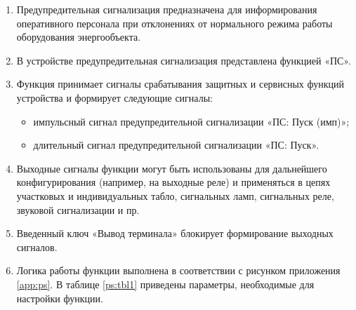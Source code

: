 
\color{black}

\begin{enumerate}

\item	
Предупредительная сигнализация предназначена для информирования оперативного персонала при отклонениях от нормального режима работы оборудования энергообъекта.

\item
В устройстве предупредительная сигнализация представлена функцией «ПС».

\item
Функция принимает сигналы срабатывания защитных и сервисных функций устройства и формирует следующие сигналы:
\begin{itemize}
	\item импульсный сигнал предупредительной сигнализации «ПС: Пуск (имп)»;
	\item длительный сигнал предупредительной сигнализации «ПС: Пуск».
\end{itemize}

\item
Выходные сигналы функции могут быть использованы для дальнейшего конфигурирования (например, на выходные реле) и применяться в цепях участковых и индивидуальных табло, сигнальных ламп, сигнальных реле, звуковой сигнализации и пр.

\item
Введенный ключ «Вывод терминала» блокирует формирование выходных сигналов.

\item
Логика работы функции выполнена в соответствии с рисунком приложения \ref{app:ps}. В таблице \ref{ps:tbl1} приведены параметры, необходимые для настройки функции. 


\end{enumerate}
\FloatBarrier %
